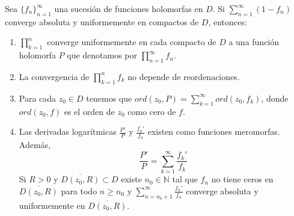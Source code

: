 \begin{theorem}
    Sea $\{f_n\}_{n=1}^\infty$ una sucesión de funciones holomorfas en $D$.
    Si $\sum_{n=1}^\infty (1-f_n)$ converge absoluta y uniformemente en compactos de $D$, entonces:
    \begin{enumerate}
        \item $\prod_{k=1}^n$ converge uniformemente en cada compacto de $D$ a una función holomorfa $P$ que denotamos por $\prod_{n=1}^\infty f_n$.
        \item La convergencia de $\prod_{k=1}^n f_k$ no depende de reordenaciones.
        \item Para cada $z_0 \in D$ tenemos que $ord(z_0, P) = \sum_{k=1}^\infty ord(z_0, f_k)$, donde $ord(z_0, f)$ es el orden de $z_0$ como cero de $f$.
        \item Las derivadas logarítmicas $\frac{P'}{P}$ y $\frac{f_n'}{f_n}$ existen como funciones meromorfas.
              Además,
              $$\frac{P'}{P} = \sum_{k=1}^\infty \frac{f_k'}{f_k}$$
              Si $R > 0$ y $\overline{D(z_0, R)} \subset D$ existe $n_0 \in \mathbb{N}$ tal que $f_n$ no tiene ceros en $\overline{D(z_0, R)}$ para todo $n \geq n_0$ y $\sum_{n=n_0+1}^\infty \frac{f_n'}{f_n}$ converge absoluta y uniformemente en $\overline{D(z_0, R)}$.
    \end{enumerate}
\end{theorem}